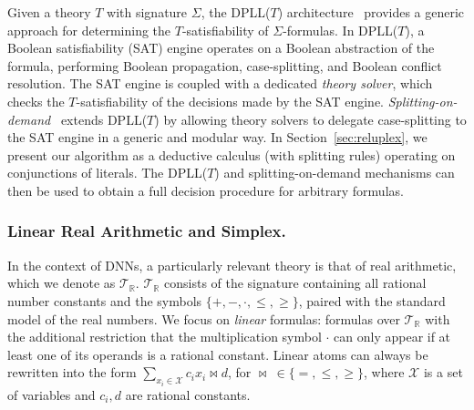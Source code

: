 \documentclass[a4paper]{llncs}
\newcommand{\allvars}{\mathcal{X}}
\newcommand{\tr}{\mathcal{T}_{\mathbb{R}}}
\begin{document}
Given a theory $T$ with signature $\Sigma$, the DPLL($T$)
architecture~\cite{NiOlTi06DPLLT} provides a generic approach for
determining the $T$-satisfiability of $\Sigma$-formulas.
In DPLL($T$), a Boolean satisfiability (SAT) engine operates on a Boolean
abstraction of the formula, performing Boolean propagation,
case-splitting, and Boolean conflict resolution. The SAT engine is
coupled with 
a dedicated \emph{theory solver}, which
checks the $T$-satisfiability of the decisions made by the SAT engine.
 \emph{Splitting-on-demand}~\cite{BaNiOlTi06}
extends DPLL($T$) by allowing theory solvers to delegate
case-splitting to the SAT engine in a generic and modular way.  In
Section~\ref{sec:reluplex}, we present 
our algorithm as a deductive calculus (with splitting rules) operating on conjunctions of literals.
The DPLL($T$) and splitting-on-demand mechanisms can then be
used to obtain a full decision procedure for arbitrary formulas.

\subsubsection{Linear Real Arithmetic and Simplex.}
In the context of DNNs, a particularly relevant theory is that
of real arithmetic, which we denote as $\tr$. $\tr{}$ consists of the
signature containing all rational number constants and the symbols 
 $\{+,-,\cdot,\leq,\geq\}$, paired with the standard model of the real numbers.
We focus on \emph{linear} formulas: formulas over $\tr{}$ with the additional
restriction that the multiplication symbol $\cdot$ can only appear if at least
one of its operands is a rational constant. Linear atoms
can always be rewritten into the form $\sum_{x_i\in
  \allvars}c_ix_i\bowtie d$, for $\bowtie\ \in\{=,\leq,\geq\}$, where
$\allvars$ is a set of variables and $c_i,d$ are rational constants.
\end{document}
